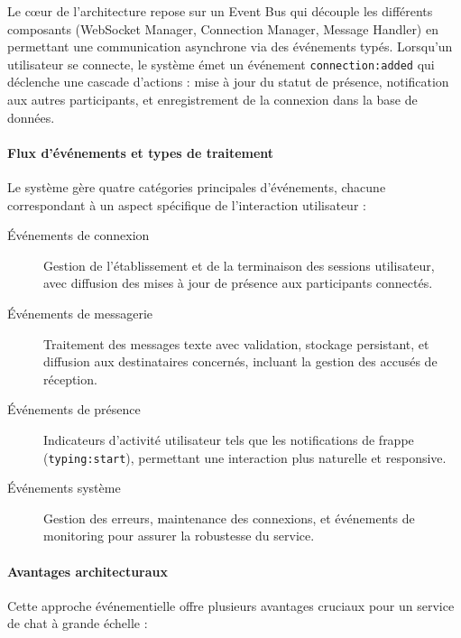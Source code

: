 \documentclass{rapportPfe}
\begin{document}
Le cœur de l'architecture repose sur un Event Bus qui découple les différents composants (WebSocket Manager, Connection Manager, Message Handler) en permettant une communication asynchrone via des événements typés. Lorsqu'un utilisateur se connecte, le système émet un événement \texttt{connection:added} qui déclenche une cascade d'actions : mise à jour du statut de présence, notification aux autres participants, et enregistrement de la connexion dans la base de données.

\paragraph{Flux d'événements et types de traitement}

Le système gère quatre catégories principales d'événements, chacune correspondant à un aspect spécifique de l'interaction utilisateur :

\begin{description}
    \item[Événements de connexion] Gestion de l'établissement et de la terminaison des sessions utilisateur, avec diffusion des mises à jour de présence aux participants connectés.
    
    \item[Événements de messagerie] Traitement des messages texte avec validation, stockage persistant, et diffusion aux destinataires concernés, incluant la gestion des accusés de réception.
    
    \item[Événements de présence] Indicateurs d'activité utilisateur tels que les notifications de frappe (\texttt{typing:start}), permettant une interaction plus naturelle et responsive.
    
    \item[Événements système] Gestion des erreurs, maintenance des connexions, et événements de monitoring pour assurer la robustesse du service.
\end{description}

\paragraph{Avantages architecturaux}

Cette approche événementielle offre plusieurs avantages cruciaux pour un service de chat à grande échelle :
\end{document}
